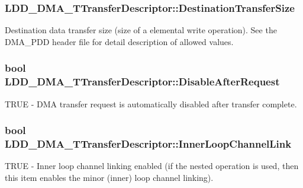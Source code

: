 \subsubsection[{Destination\+Transfer\+Size}]{ L\+D\+D\+\_\+\+D\+M\+A\+\_\+\+T\+Transfer\+Descriptor\+::\+Destination\+Transfer\+Size}\label{struct_l_d_d___d_m_a___t_transfer_descriptor_aab2978b1b8d4a4774a5e2c298d58479f}
Destination data transfer size (size of a elemental write operation). See the D\+M\+A\+\_\+\+P\+D\+D header file for detail description of allowed values. \hypertarget{struct_l_d_d___d_m_a___t_transfer_descriptor_af47462df9934c927bd3cb1c8c7a4aa94}{}
\subsubsection[{Disable\+After\+Request}]{\setlength{\rightskip}{0pt plus 5cm}bool L\+D\+D\+\_\+\+D\+M\+A\+\_\+\+T\+Transfer\+Descriptor\+::\+Disable\+After\+Request}\label{struct_l_d_d___d_m_a___t_transfer_descriptor_af47462df9934c927bd3cb1c8c7a4aa94}
T\+R\+U\+E -\/ D\+M\+A transfer request is automatically disabled after transfer complete. \hypertarget{struct_l_d_d___d_m_a___t_transfer_descriptor_a3df48f5bf31d359f8d9d28f8841e9b09}{}
\subsubsection[{Inner\+Loop\+Channel\+Link}]{\setlength{\rightskip}{0pt plus 5cm}bool L\+D\+D\+\_\+\+D\+M\+A\+\_\+\+T\+Transfer\+Descriptor\+::\+Inner\+Loop\+Channel\+Link}\label{struct_l_d_d___d_m_a___t_transfer_descriptor_a3df48f5bf31d359f8d9d28f8841e9b09}
T\+R\+U\+E -\/ Inner loop channel linking enabled (if the nested operation is used, then this item enables the minor (inner) loop channel linking). \hypertarget{struct_l_d_d___d_m_a___t_transfer_descriptor_a78eb4ce6c6e05add15799c5389637ce3}{}
